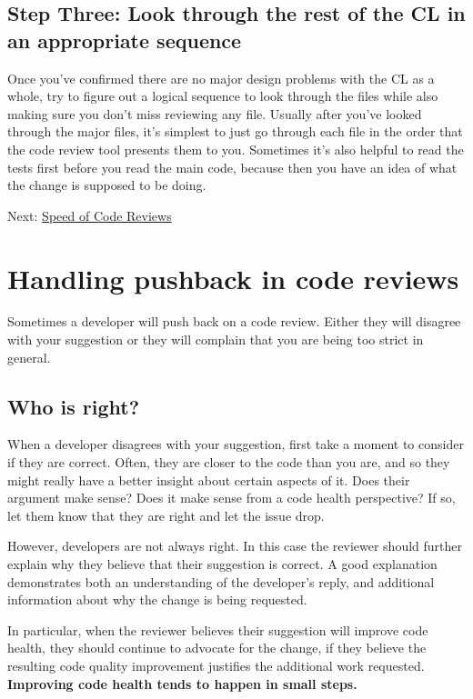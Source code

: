 \documentclass[
]{article}
\begin{document}
\subsection{Step Three: Look through the rest of the CL in an
appropriate sequence}\label{step_three}

Once you've confirmed there are no major design problems with the CL as
a whole, try to figure out a logical sequence to look through the files
while also making sure you don't miss reviewing any file. Usually after
you've looked through the major files, it's simplest to just go through
each file in the order that the code review tool presents them to you.
Sometimes it's also helpful to read the tests first before you read the
main code, because then you have an idea of what the change is supposed
to be doing.

Next: \href{speed.md}{Speed of Code Reviews}

\section{Handling pushback in code
reviews}\label{handling-pushback-in-code-reviews}

Sometimes a developer will push back on a code review. Either they will
disagree with your suggestion or they will complain that you are being
too strict in general.

\subsection{Who is right?}\label{who_is_right}

When a developer disagrees with your suggestion, first take a moment to
consider if they are correct. Often, they are closer to the code than
you are, and so they might really have a better insight about certain
aspects of it. Does their argument make sense? Does it make sense from a
code health perspective? If so, let them know that they are right and
let the issue drop.

However, developers are not always right. In this case the reviewer
should further explain why they believe that their suggestion is
correct. A good explanation demonstrates both an understanding of the
developer's reply, and additional information about why the change is
being requested.

In particular, when the reviewer believes their suggestion will improve
code health, they should continue to advocate for the change, if they
believe the resulting code quality improvement justifies the additional
work requested. \textbf{Improving code health tends to happen in small
steps.}
\end{document}
